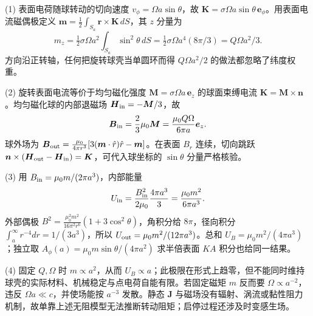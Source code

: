 (1) 表面电荷随球转动的切向速度 \(v_\phi=\Omega a\sin\theta\)，故 \(\boldsymbol K=\sigma\Omega a\sin\theta\,\boldsymbol e_\phi\)。用表面电流磁偶极定义
\(\boldsymbol m=\tfrac12\int_{S_a}\boldsymbol r\times\boldsymbol K\,dS\)，其 \(z\) 分量为
\[
m_z=\tfrac12\sigma\Omega a^2\int_{S_a}\sin^2\theta\,dS
=\tfrac12\sigma\Omega a^4(8\pi/3)=Q\Omega a^2/3.
\]
方向沿正转轴，任何把旋转球壳当单圆环而得 \(Q\Omega a^2/2\) 的做法都忽略了纬度权重。

(2) 旋转表面电流等价于均匀磁化强度 \(\boldsymbol M=\sigma\Omega a\,\boldsymbol e_z\) 的球面束缚电流 \(\boldsymbol K=\boldsymbol M\times\boldsymbol n\)。均匀磁化球的内部退磁场 \(\boldsymbol H_{\rm in}=-\boldsymbol M/3\)，故
\[
\boldsymbol B_{\rm in}=\frac23\mu_0\boldsymbol M=\frac{\mu_0Q\Omega}{6\pi a}\boldsymbol e_z.
\]
球外场为 \(\boldsymbol B_{\rm out}=\frac{\mu_0}{4\pi r^3}[3(\boldsymbol m\cdot\hat r)\hat r-\boldsymbol m]\)。在表面 \(B_r\) 连续，切向跳跃 \(\boldsymbol n\times(\boldsymbol H_{\rm out}-\boldsymbol H_{\rm in})=\boldsymbol K\)，可代入球坐标的 \(\sin\theta\) 分量严格核验。

(3) 用 \(B_{\rm in}=\mu_0m/(2\pi a^3)\)，内部能量
\[
U_{\rm in}=\frac{B_{\rm in}^2}{2\mu_0}\frac{4\pi a^3}{3}
=\frac{\mu_0m^2}{6\pi a^3}.
\]
外部偶极 \(B^2=\frac{\mu_0^2m^2}{16\pi^2r^6}(1+3\cos^2\theta)\)，角积分给 \(8\pi\)，径向积分 \(\int_a^\infty r^{-4}dr=1/(3a^3)\)，所以 \(U_{\rm out}=\mu_0m^2/(12\pi a^3)\)。总和
\(\boxed{U_B=\mu_0m^2/(4\pi a^3)}\)；独立取 \(A_\phi(a)=\mu_0m\sin\theta/(4\pi a^2)\) 求半倍表面 \(KA\) 积分也给同一结果。

(4) 固定 \(Q,\Omega\) 时 \(m\propto a^2\)，从而 \(U_B\propto a\)；此极限在形式上趋零，但不能同时维持球壳的实际材料、机械稳定与点电荷自能有限。若固定磁矩 \(m\) 反而要 \(\Omega\propto a^{-2}\)，违反 \(\Omega a\ll c\)，并使场能按 \(a^{-3}\) 发散。静态 \(\boldsymbol J\) 与磁场没有辐射、涡流或黏性阻力机制，故单靠上述无阻模型无法推断转动阻矩；启停过程还涉及时变感生场。
